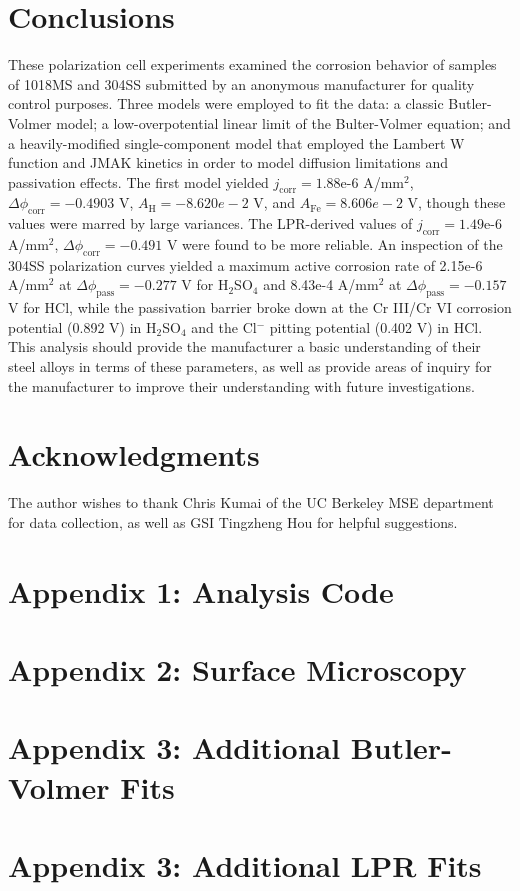 \documentclass[12pt, titlepage]{article}
\begin{document}


\section{Conclusions}

These polarization cell experiments examined the corrosion behavior of samples of 1018MS and 304SS submitted by an anonymous manufacturer for quality control purposes.  Three models were employed to fit the data: a classic Butler-Volmer model; a low-overpotential linear limit of the Bulter-Volmer equation; and a heavily-modified single-component model that employed the Lambert W function and JMAK kinetics in order to model diffusion limitations and passivation effects.  The first model yielded $j_{\text{corr}} = 1.88$e-6 A/mm$^2$, $\Delta \phi_{\text{corr}} = -0.4903$ V, $A_{\text{H}} = -8.620e-2$ V, and $A_{\text{Fe}} = 8.606e-2$ V, though these values were marred by large variances.  The LPR-derived values of $j_{\text{corr}} = 1.49$e-6 A/mm$^2$, $\Delta \phi_{\text{corr}} = -0.491$ V were found to be more reliable.  An inspection of the 304SS polarization curves yielded a maximum active corrosion rate of 2.15e-6 A/mm$^2$ at $\Delta \phi_{\text{pass}} = -0.277$ V for H$_2$SO$_4$ and 8.43e-4 A/mm$^2$ at $\Delta \phi_{\text{pass}} = -0.157$ V for HCl, while the passivation barrier broke down at the Cr III/Cr VI corrosion potential (0.892 V) in H$_2$SO$_4$ and the Cl$^-$ pitting potential (0.402 V) in HCl.  This analysis should provide the manufacturer a basic understanding of their steel alloys in terms of these parameters, as well as provide areas of inquiry for the manufacturer to improve their understanding with future investigations.

\section{Acknowledgments}

The author wishes to thank Chris Kumai of the UC Berkeley MSE department for data collection, as well as GSI Tingzheng Hou for helpful suggestions. 


\section{Appendix 1: Analysis Code}
\section{Appendix 2: Surface Microscopy}
\section{Appendix 3: Additional Butler-Volmer Fits}
\section{Appendix 3: Additional LPR Fits}
\end{document}
